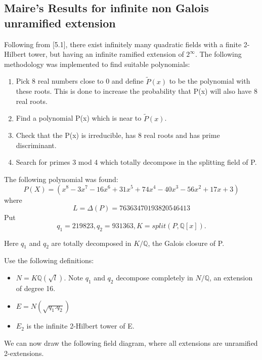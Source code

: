 \documentclass[12pt]{extarticle}
\newcommand{\<}{\langle}
\renewcommand{\>}{\rangle}
\theoremstyle{definition}
\begin{document}
\subsection{Maire's Results for infinite non Galois unramified extension}
Following from \cite{MAIR}[5.1], there exist infinitely many quadratic fields with a finite 2-Hilbert tower, but having an infinite ramified extension of $2^{\infty{}}$. 
The following methodology was implemented  to find suitable polynomials:
\begin{enumerate}
    \item Pick 8 real numbers close to 0 and define $\tilde{P}(x)$ to be the polynomial with these roots. This is done to increase the probability that P(x) will also have 8 real roots. 
    \item Find a polynomial P(x) which is near to $\tilde{P}(x)$.
    \item Check that the P(x) is irreducible, has 8 real roots and has prime discriminant. 
    \item Search for primes 3 mod 4 which totally decompose in the splitting field of P. 
\end{enumerate}
The following polynomial was found: 
\begin{equation}
    P(X) = (x^8 - 3x^7 - 16x^6 + 31x^5 + 74x^4 - 40x^3 - 56x^2 + 17x + 3)
\end{equation}
where 
\begin{equation}
    L = \Delta(P) = 76363470193820546413
\end{equation}
Put \begin{equation}
    q_1 = 219823, q_2 = 931363, K = split(P, \mathbb{Q}[x]).
\end{equation}
\par
Here $q_1$ and  $q_2$ are totally decomposed in $K/\mathbb{Q}$, the Galois closure of P.
\par
Use the following definitions: 
\begin{itemize}
    \item $N = K\mathbb{Q}(\sqrt{l})$. Note $q_1$ and $q_2$ decompose completely in $N/\mathbb{Q}$, an extension of degree 16.
    \item $E = N(\sqrt{q_1.q_2})$
    \item $E_2$ is the infinite 2-Hilbert tower of E.
\end{itemize}
\par 
We can now draw the following field diagram, where all extensions are unramified 2-extensions. 
\end{document}
